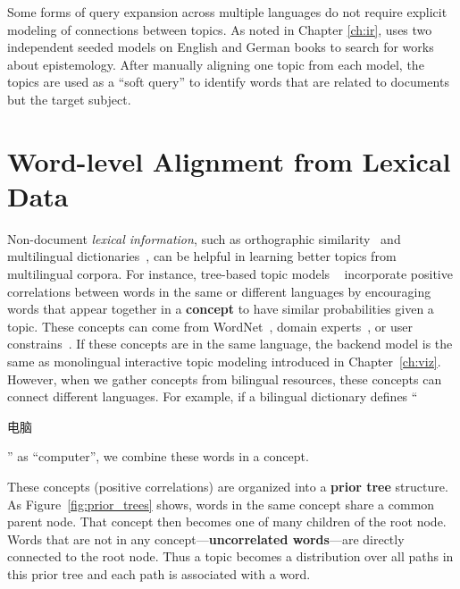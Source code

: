 Some forms of query expansion across multiple languages do not require explicit modeling of connections between topics.
As noted in Chapter \ref{ch:ir}, \cite{erlin2017topic} uses two independent seeded models on English and German books to search for works about epistemology.
After manually aligning one topic from each model, the topics are used as a ``soft query'' to identify words that are related to documents but the target subject.

\section{Word-level Alignment from  Lexical Data}

Non-document \emph{lexical information}, such as orthographic
similarity~\citep{boyd-graber-09} and multilingual
dictionaries~\citep{boyd-graber-10}, can be helpful in learning
better topics from multilingual corpora. For instance, tree-based
topic models ~\citep{boyd-graber-07,andrzejewski-09,hu-14:itm}
incorporate positive correlations between words in the same or
different languages by encouraging words that appear together in a
{\bf concept} to have similar probabilities given a topic. These
concepts can come from WordNet~\citep{boyd-graber-10}, domain
experts~\citep{andrzejewski-09}, or user
constrains~\citep{hu-14:itm}. If these concepts are in the same
language, the backend model is the same as monolingual interactive topic modeling
introduced in Chapter~\ref{ch:viz}. However, when we gather concepts
from bilingual resources, these concepts can connect different
languages. For example, if a bilingual dictionary defines
``\begin{CJK*}{UTF8}{gbsn}电脑\end{CJK*}'' as ``computer'', we combine
  these words in a concept.

These concepts (positive correlations) are organized into a {\bf prior
  tree} structure. As Figure~\ref{fig:prior_trees} shows, words in the
same concept share a common parent node. That concept then becomes
one of many children of the root node.  Words that are not in any
concept---{\bf uncorrelated words}---are directly connected to the
root node. Thus a topic becomes a distribution over all paths in this
prior tree and each path is associated with a word.

